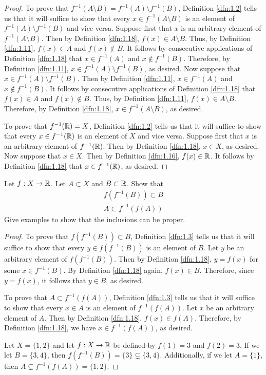 \documentclass[../main.tex]{subfiles}
\begin{document}
\begin{lemma}
\begin{proof}
        To prove that $f^{-1}(A\setminus B)=f^{-1}(A)\setminus f^{-1}(B)$, Definition \ref{dfn:1.2} tells us that it will suffice to show that every $x\in f^{-1}(A\setminus B)$ is an element of $f^{-1}(A)\setminus f^{-1}(B)$ and vice versa. Suppose first that $x$ is an arbitrary element of $f^{-1}(A\setminus B)$. Then by Definition \ref{dfn:1.18}, $f(x)\in A\setminus B$. Thus, by Definition \ref{dfn:1.11}, $f(x)\in A$ and $f(x)\notin B$. It follows by consecutive applications of Definition \ref{dfn:1.18} that $x\in f^{-1}(A)$ and $x\notin f^{-1}(B)$. Therefore, by Definition \ref{dfn:1.11}, $x\in f^{-1}(A)\setminus f^{-1}(B)$, as desired. Now suppose that $x\in f^{-1}(A)\setminus f^{-1}(B)$. Then by Definition \ref{dfn:1.11}, $x\in f^{-1}(A)$ and $x\notin f^{-1}(B)$. It follows by consecutive applications of Definition \ref{dfn:1.18} that $f(x)\in A$ and $f(x)\notin B$. Thus, by Definition \ref{dfn:1.11}, $f(x)\in A\setminus B$. Therefore, by Definition \ref{dfn:1.18}, $x\in f^{-1}(A\setminus B)$, as desired.\par
        To prove that $f^{-1}(\mathbb{R})=X$, Definition \ref{dfn:1.2} tells us that it will suffice to show that every $x\in f^{-1}(\mathbb{R})$ is an element of $X$ and vice versa. Suppose first that $x$ is an arbitrary element of $f^{-1}(\mathbb{R})$. Then by Definition \ref{dfn:1.18}, $x\in X$, as desired. Now suppose that $x\in X$. Then by Definition \ref{dfn:1.16}, $f(x)\in\mathbb{R}$. It follows by Definition \ref{dfn:1.18} that $x\in f^{-1}(\mathbb{R})$, as desired.
    \end{proof}
\end{lemma}

\begin{exercise}\label{exr:9.2}
    Let $f:X\to\mathbb{R}$. Let $A\subset X$ and $B\subset\mathbb{R}$. Show that
    \begin{gather*}
        f(f^{-1}(B)) \subset B\\
        A\subset f^{-1}(f(A))
    \end{gather*}
    Give examples to show that the inclusions can be proper.
    \begin{proof}
        To prove that $f(f^{-1}(B))\subset B$, Definition \ref{dfn:1.3} tells us that it will suffice to show that every $y\in f(f^{-1}(B))$ is an element of $B$. Let $y$ be an arbitrary element of $f(f^{-1}(B))$. Then by Definition \ref{dfn:1.18}, $y=f(x)$ for some $x\in f^{-1}(B)$. By Definition \ref{dfn:1.18} again, $f(x)\in B$. Therefore, since $y=f(x)$, it follows that $y\in B$, as desired.\par
        To prove that $A\subset f^{-1}(f(A))$, Definition \ref{dfn:1.3} tells us that it will suffice to show that every $x\in A$ is an element of $f^{-1}(f(A))$. Let $x$ be an arbitrary element of $A$. Then by Definition \ref{dfn:1.18}, $f(x)\in f(A)$. Therefore, by Definition \ref{dfn:1.18}, we have $x\in f^{-1}(f(A))$, as desired.\par
        Let $X=\{1,2\}$ and let $f:X\to\mathbb{R}$ be defined by $f(1)=3$ and $f(2)=3$. If we let $B=\{3,4\}$, then $f(f^{-1}(B))=\{3\}\subsetneq\{3,4\}$. Additionally, if we let $A=\{1\}$, then $A\subsetneq f^{-1}(f(A))=\{1,2\}$.
    \end{proof}
\end{exercise}
\end{document}
